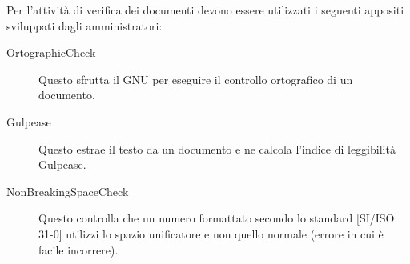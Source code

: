 	
	Per l'attività di verifica dei documenti devono essere utilizzati i seguenti appositi  sviluppati dagli amministratori:
	\begin{description}
			\item[OrtographicCheck] Questo  sfrutta il  GNU  per eseguire il controllo ortografico di un documento.
			\item[Gulpease] Questo  estrae il testo da un documento e ne calcola l'indice di leggibilità Gulpease.
			\item[NonBreakingSpaceCheck] Questo  controlla che un numero formattato secondo lo standard [SI/ISO 31-0] utilizzi lo spazio unificatore e non quello normale (errore in cui è facile incorrere).
		\end{description}
		
